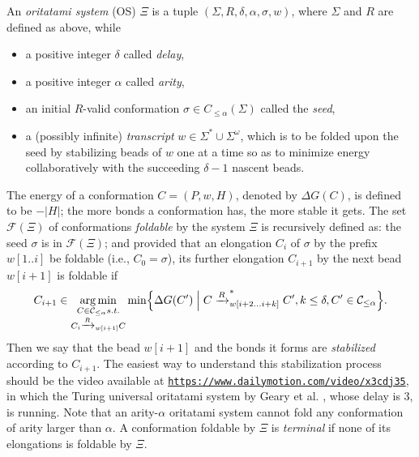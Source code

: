 \documentclass[runningheads]{llncs}
\DeclareMathOperator*{\argmin}{arg\,min}
\begin{document}
An \textit{oritatami system} (OS) $\Xi$ is a tuple $(\Sigma, R, \delta, \alpha, \sigma, w)$, where $\Sigma$ and $R$ are defined as above, while
\begin{itemize}
\item a positive integer $\delta$ called \textit{delay}, 
\item a positive integer $\alpha$ called \textit{arity}, %
\item an initial $R$-valid conformation $\sigma \in C_{\le \alpha}(\Sigma)$ called the \textit{seed},
\item a (possibly infinite) \textit{transcript} $w \in \Sigma^* \cup \Sigma^\omega$, which is to be folded upon the seed by stabilizing beads of $w$ one at a time so as to minimize energy collaboratively with the succeeding $\delta{-}1$ nascent beads. 
\end{itemize}
%
The energy of a conformation $C = (P, w, H)$, denoted by $\Delta G(C)$, is defined to be ${-}|H|$; the more bonds a conformation has, the more stable it gets. 
The set $\mathcal{F}(\Xi)$ of conformations \textit{foldable} by the system $\Xi$ is recursively defined as: the seed $\sigma$ is in $\mathcal{F}(\Xi)$; and provided that an elongation $C_i$ of $\sigma$ by the prefix $w[1..i]$ be foldable (i.e., $C_0 = \sigma$), its further elongation $C_{i+1}$ by the next bead $w[i+1]$ is foldable if 
\begin{equation}\label{eq:OS_CF}
C_{i+1} \in \argmin_{
\substack{
C \in \mathcal{C}_{\le \alpha} s.t. \\
C_i \xrightarrow{R}_{w[i+1]}C \\
}
}
\min \Bigl\{ \Delta G(C') \Bigm|
C \xrightarrow{R}^*_{w[i+2...i+k]}C', k\le \delta, C' \in \mathcal{C}_{\le \alpha}
\Bigr\}.
\end{equation}
%
Then we say that the bead $w[i+1]$ and the bonds it forms are \textit{stabilized} according to $C_{i+1}$. 
The easiest way to understand this stabilization process should be the video available at \href{https://www.dailymotion.com/video/x3cdj35}{\tt https://www.dailymotion.com/video/x3cdj35}, in which the Turing universal oritatami system by Geary et al. \cite{GeMeScSe2018}, whose delay is 3, is running. 
Note that an arity-$\alpha$ oritatami system cannot fold any conformation of arity larger than $\alpha$. %
A conformation foldable by $\Xi$ is \textit{terminal} if none of its elongations is foldable by $\Xi$. 
\end{document}
